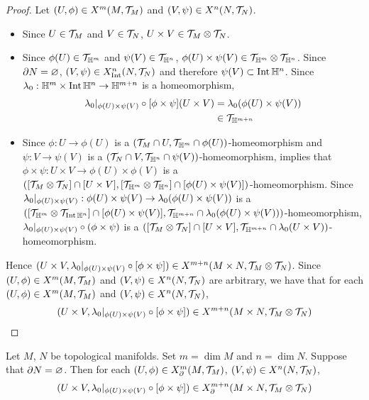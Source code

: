 \documentclass{book}
\begin{document}
\begin{proof}
	Let $(U, \phi) \in X^m(M, \mathcal{T}_M)$ and $(V, \psi) \in X^n(N, \mathcal{T}_N)$. 
	\begin{itemize}
		\item Since $U \in \mathcal{T}_M$ and $V \in \mathcal{T}_N$, $U \times V \in \mathcal{T}_M \otimes \mathcal{T}_N$. 
		\item Since $\phi(U) \in \mathcal{T}_{\mathbb{H}^m}$ and $\psi(V) \in \mathcal{T}_{\mathbb{H}^n}$, $\phi(U) \times \psi(V) \in \mathcal{T}_{\mathbb{H}^m} \otimes \mathcal{T}_{\mathbb{H}^n}$. Since $\partial N = \varnothing$, $(V, \psi) \in X^n_{\operatorname{Int}}(N, \mathcal{T}_N)$ and therefore $\psi(V) \subset \operatorname{Int} \mathbb{H}^n$. Since $\lambda_0: \mathbb{H}^m \times \operatorname{Int} \mathbb{H}^n \rightarrow \mathbb{H}^{m+n}$ is a homeomorphism, 
		\begin{align*}
			\lambda_0|_{\phi(U) \times \psi(V)} \circ [\phi \times \psi](U \times V)
			& = \lambda_0 (\phi(U) \times \psi(V)) \\
			& \in \mathcal{T}_{\mathbb{H}^{m+n}}
		\end{align*}
		\item Since $\phi:U \rightarrow \phi(U)$ is a $(\mathcal{T}_M \cap U, \mathcal{T}_{\mathbb{H}^m} \cap \phi(U))$-homeomorphism and $\psi: V \rightarrow \psi(V)$ is a $(\mathcal{T}_N \cap V, \mathcal{T}_{\mathbb{H}^n} \cap \psi(V))$-homeomorphism,  implies that $\phi \times \psi: U \times V \rightarrow \phi(U) \times \phi(V)$ is a $([\mathcal{T}_M \otimes \mathcal{T}_N] \cap [U \times V], [\mathcal{T}_{\mathbb{H}^m} \otimes \mathcal{T}_{\mathbb{H}^n}] \cap [\phi(U) \times \psi(V)])$-homeomorphism. Since $\lambda_0|_{\phi(U) \times \psi(V)}: \phi(U) \times \psi(V) \rightarrow \lambda_0(\phi(U) \times \psi(V))$ is a $([\mathcal{T}_{\mathbb{H}^m} \otimes \mathcal{T}_{\operatorname{Int} \mathbb{H}^n}] \cap[ \phi(U) \times \psi(V)], \mathcal{T}_{\mathbb{H}^{m+n}} \cap \lambda_0(\phi(U) \times \psi(V)))$-homeomorphism, $\lambda_0|_{\phi(U) \times \psi(V)} \circ (\phi \times \psi)$ is a $([\mathcal{T}_M \otimes \mathcal{T}_N] \cap [U \times V], \mathcal{T}_{\mathbb{H}^{m+n}} \cap \lambda_0(U \times V))$-homeomorphism.
	\end{itemize}
	Hence $(U \times V,\lambda_0|_{\phi(U) \times \psi(V)} \circ [\phi \times \psi]) \in X^{m+n}(M \times N, \mathcal{T}_M \otimes \mathcal{T}_N)$. Since $(U, \phi) \in X^m(M, \mathcal{T}_M)$ and $(V, \psi) \in X^n(N, \mathcal{T}_N)$ are arbitrary, we have that for each $(U, \phi) \in X^m(M, \mathcal{T}_M)$ and $(V, \psi) \in X^n(N, \mathcal{T}_N)$, $$(U \times V, \lambda_0|_{\phi(U) \times \psi(V)} \circ [\phi \times \psi]) \in X^{m+n}(M \times N,  \mathcal{T}_M \otimes \mathcal{T}_N)$$ 
\end{proof}

\begin{ex} 
	Let $M$, $N$ be topological manifolds. Set $m = \dim M$ and $n = \dim N$. Suppose that $\partial N = \varnothing$. Then for each $(U, \phi) \in X^m_{\partial}(M, \mathcal{T}_M)$, $(V, \psi) \in X^n(N, \mathcal{T}_N)$, 
	$$(U \times V, \lambda_0|_{\phi(U) \times \psi(V)} \circ [\phi \times \psi]) \in X^{m+n}_{\partial}(M \times N,  \mathcal{T}_M \otimes \mathcal{T}_N)$$ 
\end{ex}
\end{document}
